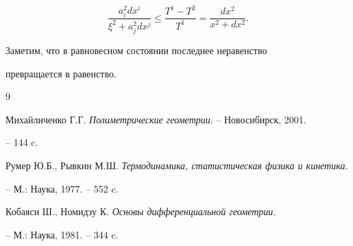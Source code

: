 $$


\frac{a^2_idx^i}{\xi^2+a^2_jdx^j} \le


\frac{T^1 - T^2}{T^1}=\frac{dx^2}{x^2+dx^2}.


$$


Заметим, что в равновесном состоянии последнее неравенство


превращается в равенство.











\begin{thebibliography}{9}







Михайличенко Г.Г. {\em Полиметрические геометрии}. -- Новосибирск, 2001. 


-- 144 c.




Румер Ю.Б., Рывкин М.Ш. {\em Термодинамика, статистическая физика и кинетика}.


-- М.: Наука, 1977. -- 552 c.




Кобаяси Ш., Номидзу К. {\em Основы дифференциальной геометрии}. 


-- М.: Наука, 1981. -- 344 c.





\end{thebibliography}





\vskip 2cm












\label{end}





